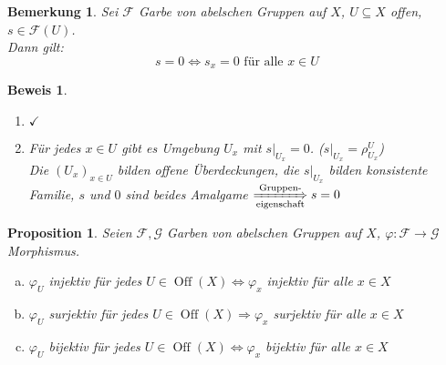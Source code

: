 \documentclass[a4paper, 12pt, numbers=noendperiod, chapterprefix=true]{scrbook}
\theoremstyle{break}
\newtheorem{Bem}[Def]{Bemerkung}
\newtheorem{Prop}[Def]{Proposition}
\theoremstyle{nonumberbreak}
\newtheorem{bew}{Beweis}
\theoremstyle{nonumberplain}
\newcommand{\quot}[1]{\textrm{\glqq}{#1}\textrm{\grqq}}
\newenvironment{twosidedproof}{\begin{enumerate}[\quot{$\Rightarrow$}:]}{\end{enumerate}}
\newcommand{\proofforward}{\item[\quot{$\Rightarrow$}:]}
\newcommand{\proofreverse}{\item[\quot{$\Leftarrow$}:]}
\DeclareMathOperator{\Off}{Off}
\newcommand{\calF}{\mathcal{F}}
\newcommand{\calG}{\mathcal{G}}
\begin{document}

\begin{Bem}\label{1.7}
Sei $\calF$ Garbe von abelschen Gruppen auf $X$, $U\subseteq X$ offen, $s\in \calF(U)$.\\
Dann gilt:
  \[s=0 \Leftrightarrow s_x = 0 \text{ f\"ur alle } x\in U\]
\end{Bem}

\begin{bew}\begin{twosidedproof}
\proofforward
  $\checkmark$
\proofreverse
  F\"ur jedes $x\in U$ gibt es Umgebung $U_x$ mit $s|_{U_x} = 0$. ($s|_{U_x} = \rho_{U_x}^U$)\\
  Die $(U_x)_{x\in U}$ bilden offene \"Uberdeckungen, die $s|_{U_x}$ bilden konsistente Familie, $s$ und $0$ sind beides Amalgame $\xRightarrow[\text{eigenschaft}]{\text{Gruppen-}} s= 0$
\end{twosidedproof}\end{bew}

\begin{Prop}\label{1.8}
Seien $\calF, \calG$ Garben von abelschen Gruppen auf $X$, $\varphi: \calF \to \calG$ Morphismus.
\begin{enumerate}[a)]
\item\label{1.8a}
  $\varphi_U$ injektiv f\"ur jedes $U\in \Off(X) \Leftrightarrow \varphi_x$ injektiv f\"ur alle $x\in X$
\item
  $\varphi_U$ surjektiv f\"ur jedes $U\in \Off(X) \Rightarrow \varphi_x$ surjektiv f\"ur alle $x\in X$
\item
  $\varphi_U$ bijektiv f\"ur jedes $U\in \Off(X) \Leftrightarrow \varphi_x$ bijektiv f\"ur alle $x\in X$
\end{enumerate}\end{Prop}
\end{document}
